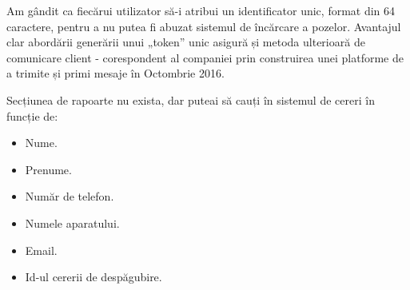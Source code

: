 	Am gândit ca fiecărui utilizator să-i atribui un identificator unic, format din 64 caractere, pentru a nu putea fi abuzat sistemul de încărcare a pozelor.
	Avantajul clar abordării generării unui „token” unic asigură și metoda ulterioară de comunicare client - corespondent al companiei prin construirea unei platforme de a trimite și primi mesaje în Octombrie 2016.

	Secțiunea de rapoarte nu exista, dar puteai să cauți în sistemul de cereri în funcție de:
	\begin{itemize}
		\item Nume.
		\item Prenume.
		\item Număr de telefon.
		\item Numele aparatului.
		\item Email.
		\item Id-ul cererii de despăgubire.
	\end{itemize}
